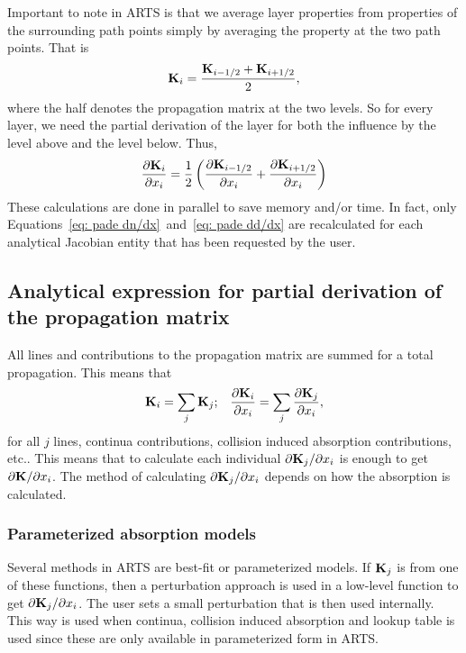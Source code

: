 Important to note in ARTS is that we average layer properties from properties of the surrounding path points simply by
averaging the property at the two path points.
That is
\begin{equation}
   \mathbf{K}_i = \frac{ \mathbf{K}_{i-1/2}+\mathbf{K}_{i+1/2}}{2},
\end{equation}
where the half denotes the propagation matrix at the two levels.  
So for every layer, we need the partial derivation of the layer for both the influence
by the level above and the level below. Thus, 
\begin{equation}
  \frac{\partial \mathbf{K}_i}{\partial x_i} = \frac{1}{2}\left(\frac{\partial \mathbf{K}_{i-1/2}}{\partial x_i}+\frac{\partial \mathbf{K}_{i+1/2}}{\partial x_i}\right)
\end{equation}
These calculations are done in parallel to save memory and/or time.  In fact, only
Equations~\ref{eq: pade dn/dx}~and~\ref{eq: pade dd/dx} are recalculated for each analytical Jacobian entity that has been requested
by the user.

\subsection{Analytical expression for partial derivation of the propagation matrix}

All lines and contributions to the propagation matrix are summed for a total
propagation.  This means that
\begin{equation}
  \mathbf{K}_i = \sum_j \mathbf{K}_j;\;\;\;\frac{\partial \mathbf{K}_i}{\partial x_i} = \sum_j \frac{\partial \mathbf{K}_j}{\partial x_i},
  \label{eq: general dk/dx}
\end{equation}
for all $j$ lines, continua contributions, collision induced absorption contributions, etc..
This means that to calculate each individual ${\partial \mathbf{K}_j}/{\partial x_i}$ is enough to get 
${\partial \mathbf{K}}/{\partial x_i}$.  The method of calculating ${\partial \mathbf{K}_j}/{\partial x_i}$
depends on how the absorption is calculated.  


\subsubsection{Parameterized absorption models}

Several methods in ARTS are best-fit or parameterized models.  If $\mathbf{K}_j$ is 
from one of these functions, then a perturbation approach is used in a
low-level function to get ${\partial \mathbf{K}_j}/{\partial x_i}$.  The user sets a 
small perturbation that is then used internally.  
This way is used when continua, collision induced absorption and lookup table 
is used since these are only available in parameterized form in ARTS.

